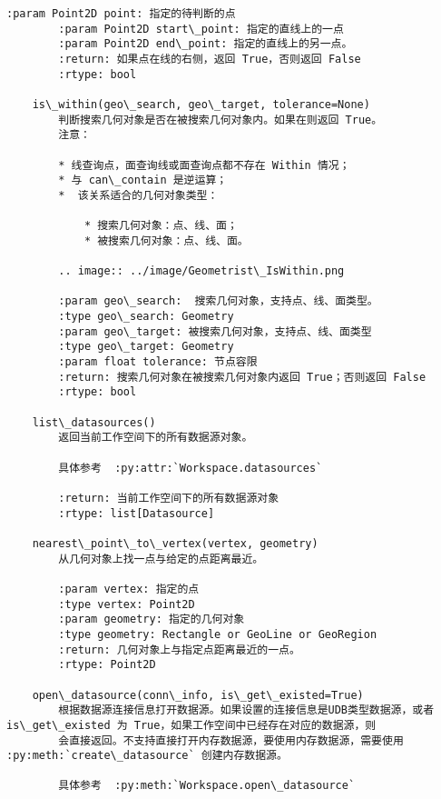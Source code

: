\documentclass[11pt]{article}
\begin{document}
\begin{Verbatim}[commandchars=\\\{\}]
        :param Point2D point: 指定的待判断的点
        :param Point2D start\_point: 指定的直线上的一点
        :param Point2D end\_point: 指定的直线上的另一点。
        :return: 如果点在线的右侧，返回 True，否则返回 False
        :rtype: bool
    
    is\_within(geo\_search, geo\_target, tolerance=None)
        判断搜索几何对象是否在被搜索几何对象内。如果在则返回 True。
        注意：
        
        * 线查询点，面查询线或面查询点都不存在 Within 情况；
        * 与 can\_contain 是逆运算；
        *  该关系适合的几何对象类型：
        
            * 搜索几何对象：点、线、面；
            * 被搜索几何对象：点、线、面。
        
        .. image:: ../image/Geometrist\_IsWithin.png
        
        :param geo\_search:  搜索几何对象，支持点、线、面类型。
        :type geo\_search: Geometry
        :param geo\_target: 被搜索几何对象，支持点、线、面类型
        :type geo\_target: Geometry
        :param float tolerance: 节点容限
        :return: 搜索几何对象在被搜索几何对象内返回 True；否则返回 False
        :rtype: bool
    
    list\_datasources()
        返回当前工作空间下的所有数据源对象。
        
        具体参考  :py:attr:`Workspace.datasources`
        
        :return: 当前工作空间下的所有数据源对象
        :rtype: list[Datasource]
    
    nearest\_point\_to\_vertex(vertex, geometry)
        从几何对象上找一点与给定的点距离最近。
        
        :param vertex: 指定的点
        :type vertex: Point2D
        :param geometry: 指定的几何对象
        :type geometry: Rectangle or GeoLine or GeoRegion
        :return: 几何对象上与指定点距离最近的一点。
        :rtype: Point2D
    
    open\_datasource(conn\_info, is\_get\_existed=True)
        根据数据源连接信息打开数据源。如果设置的连接信息是UDB类型数据源，或者 is\_get\_existed 为 True，如果工作空间中已经存在对应的数据源，则
        会直接返回。不支持直接打开内存数据源，要使用内存数据源，需要使用 :py:meth:`create\_datasource` 创建内存数据源。
        
        具体参考  :py:meth:`Workspace.open\_datasource`
        

\end{Verbatim}
\end{document}

